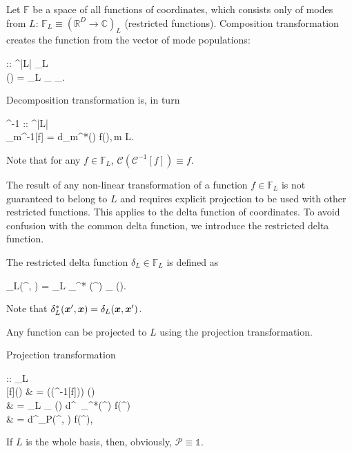 \begin{definition}
	Let $\mathbb{F}$ be a space of all functions of coordinates, which consists only of modes from $L$: $\mathbb{F}_L \equiv (\mathbb{R}^D \rightarrow \mathbb{C})_L$ (restricted functions).
	Composition transformation creates the function from the vector of mode populations:
	\begin{eqn*}
		 :: ^{|L|} \rightarrow {}_L \\
		(\balpha) = \sum_{\nvec \in L} \phi_{\nvec} \alpha_{\nvec}.
	\end{eqn*}
	Decomposition transformation is, in turn
	\begin{eqn*}
		^{-1} ::  \rightarrow {}^{|L|} \\
		_m^{-1}[f] = \int d\xvec \phi_m^*(\xvec) f(\xvec),\,m \in L.
	\end{eqn*}
	Note that for any $f \in \mathbb{F}_L$, $\mathcal{C}(\mathcal{C}^{-1}[f]) \equiv f$.
\end{definition}

The result of any non-linear transformation of a function $f \in \mathbb{F}_L$ is not guaranteed to belong to $L$ and requires explicit projection to be used with other restricted functions.
This applies to the delta function of coordinates.
To avoid confusion with the common delta function, we introduce the restricted delta function.

\begin{definition}
\label{def:func-calculus:restricted-delta}
	The restricted delta function $\delta_L \in \mathbb{F}_L$ is defined as
	\begin{eqn*}
		\delta_L(\xvec^\prime, \xvec)
		= \sum_{\nvec \in L} \phi_{\nvec}^* (\xvec^\prime) \phi_{\nvec} (\xvec).
	\end{eqn*}
	Note that $\delta_L^*(\boldsymbol{x}^\prime, \boldsymbol{x}) = \delta_L(\boldsymbol{x}, \boldsymbol{x}^\prime)$.
\end{definition}

Any function can be projected to $L$ using the projection transformation.

\begin{definition}
\label{def:func-calculus:projector}
	Projection transformation
	\begin{eqn*}
		\mathcal{P} ::
		 \rightarrow {}_L \\
		[f](\xvec)
		& = ((^{-1}[f])) (\xvec) \\
		& = \sum_{\nvec \in L} \phi_{\nvec} (\xvec) \int
			d\xvec^\prime\, \phi_{\nvec}^*(\xvec^\prime) f(\xvec^\prime) \\
		& = \int d\xvec^\prime \delta_P(\xvec^\prime, \xvec) f(\xvec^\prime),
	\end{eqn*}
	If $L$ is the whole basis, then, obviously, $ \equiv \mathds{1}$.
\end{definition}

